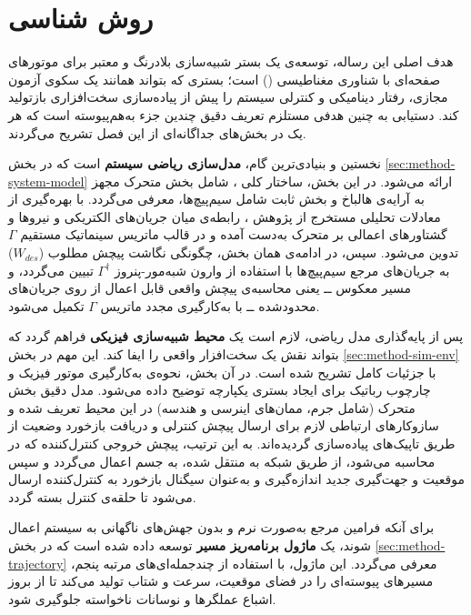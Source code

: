 \chapter{روش شناسی}
\label{ch:method}

هدف اصلی این رساله، توسعه‌ی یک بستر شبیه‌سازی بلادرنگ و معتبر برای موتورهای صفحه‌ای با شناوری مغناطیسی () است؛ بستری که بتواند همانند یک سکوی آزمون مجازی، رفتار دینامیکی و کنترلی سیستم را پیش از پیاده‌سازی سخت‌افزاری بازتولید کند. دستیابی به چنین هدفی مستلزم تعریف دقیق چندین جزء به‌هم‌پیوسته است که هر یک در بخش‌های جداگانه‌ای از این فصل تشریح می‌گردند.

نخستین و بنیادی‌ترین گام، \textbf{مدل‌سازی ریاضی سیستم} است که در بخش \ref{sec:method-system-model} ارائه می‌شود. در این بخش، ساختار کلی ، شامل بخش متحرک مجهز به آرایه‌ی هالباخ و بخش ثابت شامل سیم‌پیچ‌ها، معرفی می‌گردد. با بهره‌گیری از معادلات تحلیلی مستخرج از پژوهش \cite{RN10}، رابطه‌ی میان جریان‌های الکتریکی و نیروها و گشتاورهای اعمالی بر متحرک به‌دست آمده و در قالب ماتریس سینماتیک مستقیم $\Gamma$ تدوین می‌شود. سپس، در ادامه‌ی همان بخش، چگونگی نگاشت پیچش مطلوب ($W_{des}$) به جریان‌های مرجع سیم‌پیچ‌ها با استفاده از وارون شبه‌مور-پنروز $\Gamma^\dagger$ تبیین می‌گردد، و مسیر معکوس ــ یعنی محاسبه‌ی پیچش واقعی قابل اعمال از روی جریان‌های محدودشده ــ با به‌کارگیری مجدد ماتریس $\Gamma$ تکمیل می‌شود.

پس از پایه‌گذاری مدل ریاضی، لازم است یک \textbf{محیط شبیه‌سازی فیزیکی} فراهم گردد که بتواند نقش یک سخت‌افزار واقعی را ایفا کند. این مهم در بخش \ref{sec:method-sim-env} با جزئیات کامل تشریح شده است. در آن بخش، نحوه‌ی به‌کارگیری موتور فیزیک  و چارچوب رباتیک  برای ایجاد بستری یکپارچه توضیح داده می‌شود. مدل دقیق بخش متحرک (شامل جرم، ممان‌های اینرسی و هندسه) در این محیط تعریف شده و سازوکارهای ارتباطی لازم برای ارسال پیچش کنترلی و دریافت بازخورد وضعیت از طریق تاپیک‌های  پیاده‌سازی گردیده‌اند. به این ترتیب، پیچش خروجی کنترل‌کننده که در  محاسبه می‌شود، از طریق شبکه به  منتقل شده، به جسم اعمال می‌گردد و سپس موقعیت و جهت‌گیری جدید اندازه‌گیری و به‌عنوان سیگنال بازخورد به کنترل‌کننده ارسال می‌شود تا حلقه‌ی کنترل بسته گردد.

برای آنکه فرامین مرجع به‌صورت نرم و بدون جهش‌های ناگهانی به سیستم اعمال شوند، یک \textbf{ماژول برنامه‌ریز مسیر} توسعه داده شده است که در بخش \ref{sec:method-trajectory} معرفی می‌گردد. این ماژول، با استفاده از چندجمله‌ای‌های مرتبه پنجم، مسیرهای پیوسته‌ای را در فضای موقعیت، سرعت و شتاب تولید می‌کند تا از بروز اشباع عملگرها و نوسانات ناخواسته جلوگیری شود.

